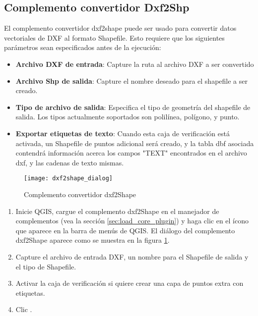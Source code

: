 
\subsection{Complemento convertidor Dxf2Shp}


El complemento convertidor dxf2shape puede ser usado para convertir datos vectoriales de DXF al formato Shapefile. Esto requiere que los siguientes parámetros sean especificados antes de la ejecución:

\begin{itemize}
\item \textbf{Archivo DXF de entrada}: Capture la ruta al archivo DXF a ser convertido
\item \textbf{Archivo Shp de salida}: Capture el nombre deseado para el shapefile a ser creado.
\item \textbf{Tipo de archivo de salida}: Especifica el tipo de geometría del shapefile de salida. 
Los tipos actualmente soportados son polilínea, polígono, y punto.
\item \textbf{Exportar etiquetas de texto}: Cuando esta caja de verificación está activada, un Shapefile de puntos adicional será creado, y la tabla dbf asociada contendrá información acerca los campos "TEXT" encontrados en el archivo dxf, y las cadenas de texto mismas.
\end{itemize}

\begin{figure}[ht]
   \begin{center}
   \caption{Complemento convertidor dxf2Shape \nixcaption}\label{fig:dxf2shape_dialog}\smallskip
   \texttt{[image: dxf2shape\_dialog]}
\end{center}  
\end{figure}


\begin{enumerate}
  \item Inicie QGIS, cargue el complemento dxf2Shape en el manejador de complementos (vea la sección 
  \ref{sec:load_core_plugin}) y haga clic en el ícono  
  que aparece en la barra de menús de QGIS. El diálogo del complemento dxf2Shape aparece como se muestra en la figura \ref{fig:dxf2shape_dialog}.
  \item Capture el archivo de entrada DXF, un nombre para el Shapefile de salida y el tipo de Shapefile.
  \item Activar la caja de verificación  si quiere crear una capa de puntos extra con etiquetas.
  \item Clic . 
\end{enumerate}

\newpage

